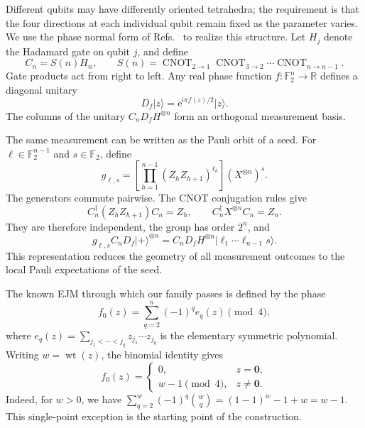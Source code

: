 \documentclass[11pt,a4paper]{article}
\numberwithin{equation}{section}
\theoremstyle{definition}
\newcommand{\F}{\mathbb F}
\newcommand{\R}{\mathbb R}
\newcommand{\ii}{\mathrm i}
\newcommand{\ee}{\mathrm e}
\newcommand{\wt}{\operatorname{wt}}
\newcommand{\ket}[1]{\lvert#1\rangle}
\newcommand{\zero}{\bm 0}
\begin{document}
Different qubits may have differently oriented tetrahedra; the requirement is that the four directions at each individual qubit remain fixed as the parameter varies. We use the phase normal form of Refs.\ \cite{PauwelsPauli2026,PauwelsTunable2026} to realize this structure. Let $H_j$ denote the Hadamard gate on qubit $j$, and define
\begin{equation}
 C_n=S(n)H_n,\qquad
 S(n)=\operatorname{CNOT}_{2\to1}\operatorname{CNOT}_{3\to2}\cdots
       \operatorname{CNOT}_{n\to n-1}.
 \label{eq:circuit}
\end{equation}
Gate products act from right to left. Any real phase function $f:\F_2^n\to\R$ defines a diagonal unitary
\begin{equation}
 D_f\ket z=\ee^{\ii\pi f(z)/2}\ket z.
\end{equation}
The columns of the unitary $C_nD_fH^{\otimes n}$ form an orthogonal measurement basis.

The same measurement can be written as the Pauli orbit of a seed. For $\ell\in\F_2^{n-1}$ and $s\in\F_2$, define
\begin{equation}
 g_{\ell,s}=\left[\prod_{h=1}^{n-1}(Z_hZ_{h+1})^{\ell_h}\right]
            (X^{\otimes n})^s.
 \label{eq:group}
\end{equation}
The generators commute pairwise. The CNOT conjugation rules give
\begin{equation}
 C_n^\dagger(Z_hZ_{h+1})C_n=Z_h,\qquad
 C_n^\dagger X^{\otimes n}C_n=Z_n.
 \label{eq:group-pullback}
\end{equation}
They are therefore independent, the group has order $2^n$, and
\begin{equation}
 g_{\ell,s}C_nD_f\ket+^{\otimes n}
 =C_nD_fH^{\otimes n}\ket{\ell_1\cdots\ell_{n-1}s}.
 \label{eq:orbit}
\end{equation}
This representation reduces the geometry of all measurement outcomes to the local Pauli expectations of the seed.

The known EJM through which our family passes is defined by the phase~\cite[Theorem~1]{PauwelsTunable2026}
\begin{equation}
 f_0(z)=\sum_{q=2}^{n}(-1)^q e_q(z)\pmod4,
 \label{eq:f0-symmetric}
\end{equation}
where $e_q(z)=\sum_{j_1<\cdots<j_q}z_{j_1}\cdots z_{j_q}$ is the elementary symmetric polynomial. Writing $w=\wt(z)$, the binomial identity gives
\begin{equation}
 f_0(z)=
 \begin{cases}
 0,&z=\zero,\\
 w-1\pmod4,&z\ne\zero.
 \end{cases}
 \label{eq:f0-weight}
\end{equation}
Indeed, for $w>0$, we have $\sum_{q=2}^w(-1)^q\binom wq=(1-1)^w-1+w=w-1$. This single-point exception is the starting point of the construction.
\end{document}
